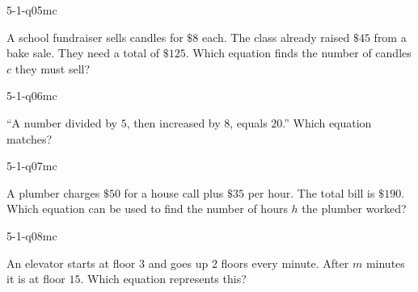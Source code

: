 \begin{practiceQuestion}{5-1-q05}{mc}
\begin{questionText}
A school fundraiser sells candles for $\$8$ each. The class already raised $\$45$ from a bake sale. They need a total of $\$125$. Which equation finds the number of candles $c$ they must sell?
\end{questionText}
\end{practiceQuestion}

\begin{practiceQuestion}{5-1-q06}{mc}
\begin{questionText}
``A number divided by $5$, then increased by $8$, equals $20$.'' Which equation matches?
\end{questionText}
\end{practiceQuestion}

\begin{practiceQuestion}{5-1-q07}{mc}
\begin{questionText}
A plumber charges $\$50$ for a house call plus $\$35$ per hour. The total bill is $\$190$. Which equation can be used to find the number of hours $h$ the plumber worked?
\end{questionText}
\end{practiceQuestion}

\begin{practiceQuestion}{5-1-q08}{mc}
\begin{questionText}
An elevator starts at floor $3$ and goes up $2$ floors every minute. After $m$ minutes it is at floor $15$. Which equation represents this?
\end{questionText}
\end{practiceQuestion}

